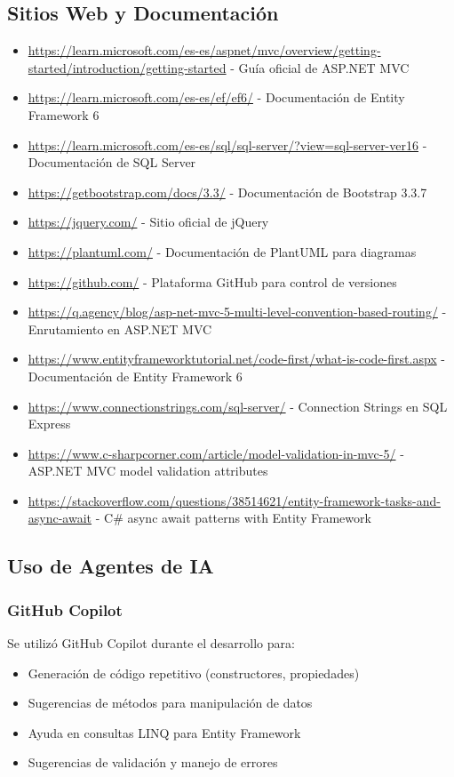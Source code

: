 \documentclass[12pt]{article}
\begin{document}
\subsection*{Sitios Web y Documentación}
\begin{itemize}
    \item \url{https://learn.microsoft.com/es-es/aspnet/mvc/overview/getting-started/introduction/getting-started} - Guía oficial de ASP.NET MVC
    \item \url{https://learn.microsoft.com/es-es/ef/ef6/} - Documentación de Entity Framework 6
    \item \url{https://learn.microsoft.com/es-es/sql/sql-server/?view=sql-server-ver16} - Documentación de SQL Server
    \item \url{https://getbootstrap.com/docs/3.3/} - Documentación de Bootstrap 3.3.7
    \item \url{https://jquery.com/} - Sitio oficial de jQuery
    \item \url{https://plantuml.com/} - Documentación de PlantUML para diagramas
    \item \url{https://github.com/} - Plataforma GitHub para control de versiones
    \item \url{https://q.agency/blog/asp-net-mvc-5-multi-level-convention-based-routing/} - Enrutamiento en ASP.NET MVC
    \item \url{https://www.entityframeworktutorial.net/code-first/what-is-code-first.aspx} - Documentación de Entity Framework 6
    \item \url{https://www.connectionstrings.com/sql-server/} - Connection Strings en SQL Express
    \item \url{https://www.c-sharpcorner.com/article/model-validation-in-mvc-5/} - ASP.NET MVC model validation attributes
    \item \url{https://stackoverflow.com/questions/38514621/entity-framework-tasks-and-async-await} - C\# async await patterns with Entity Framework
\end{itemize}

\subsection*{Uso de Agentes de IA}

\subsubsection*{GitHub Copilot}
Se utilizó GitHub Copilot durante el desarrollo para:
\begin{itemize}
    \item Generación de código repetitivo (constructores, propiedades)
    \item Sugerencias de métodos para manipulación de datos
    \item Ayuda en consultas LINQ para Entity Framework
    \item Sugerencias de validación y manejo de errores
\end{itemize}
\end{document}
